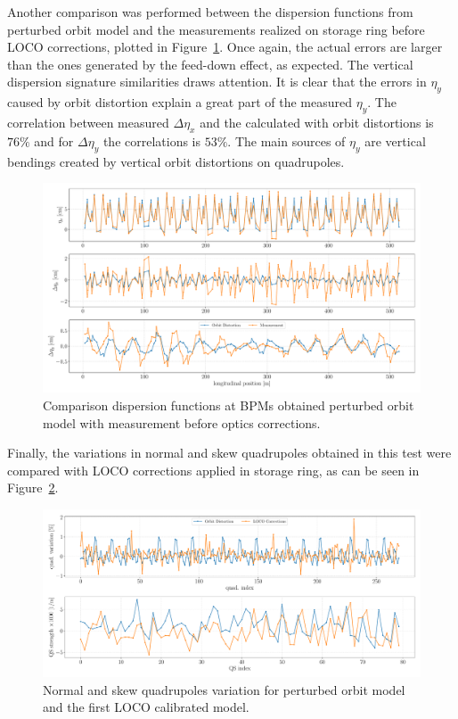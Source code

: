 Another comparison was performed between the dispersion functions from perturbed orbit model and the measurements realized on storage ring before LOCO corrections, plotted in Figure~\ref{fig:disperson_orb}. Once again, the actual errors are larger than the ones generated by the feed-down effect, as expected. The vertical dispersion signature similarities draws attention. It is clear that the errors in $\eta_y$ caused by orbit distortion explain a great part of the measured $\eta_y$. The correlation between measured $\Delta\eta_x$ and the calculated with orbit distortions is $76\%$ and for $\Delta\eta_y$ the correlations is $53\%$. The main sources of $\eta_y$ are vertical bendings created by vertical orbit distortions on quadrupoles.
\begin{figure}[h!]
\centering
\includegraphics[width=1.0\textwidth]{figures/dispersion_orbit_iter0.pdf}
\caption{Comparison dispersion functions at BPMs obtained perturbed orbit model with measurement before optics corrections.}
\label{fig:disperson_orb}
\end{figure}

Finally, the variations in normal and skew quadrupoles obtained in this test were compared with LOCO corrections applied in storage ring, as can be seen in Figure~\ref{fig:corrections_orb}.
\begin{figure}[h!]
\centering
\includegraphics[width=1.0\textwidth]{figures/corrections_orb_residue_loco_iter0.pdf}
\caption{Normal and skew quadrupoles variation for perturbed orbit model and the first LOCO calibrated model.}
\label{fig:corrections_orb}
\end{figure}

